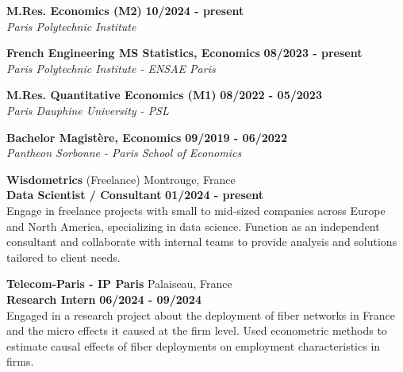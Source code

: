 \begin{flushleft}
\raisebox{-.6ex}{HIGHER EDUCATION} \hrulefill
\end{flushleft}

    \noindent\textbf{M.Res. \textbar\space Economics (M2)}
    \hfill
    \textbf{10/2024 - present} \\
    \emph{Paris Polytechnic Institute} 

    \noindent\textbf{French Engineering MS \textbar\space Statistics,  Economics}
    \hfill
    \textbf{08/2023 - present} \\
    \emph{Paris Polytechnic Institute - ENSAE Paris}

    \noindent\textbf{M.Res. \textbar\space Quantitative Economics (M1)}
    \hfill
    \textbf{08/2022 - 05/2023} \\
    \emph{Paris Dauphine University - PSL}

    \noindent\textbf{Bachelor \textbar\space Magistère, Economics}
    \hfill
    \textbf{09/2019 - 06/2022} \\
    \emph{Pantheon Sorbonne - Paris School of Economics}
	

\begin{flushleft}
\raisebox{-.6ex}{WORK \& RESEARCH EXPERIENCE} \hrulefill
\end{flushleft}
	\noindent\textbf{Wisdometrics} (Freelance) \hfill Montrouge, France\\[0.1cm]
    \textbf{Data Scientist / Consultant} \hfill \textbf{01/2024  - present} \\
	Engage in freelance projects with small to mid-sized companies across Europe and North America, specializing in data science. Function as an independent consultant and collaborate with internal teams to provide analysis and solutions tailored to client needs.
    
    \vspace{0.15cm}
    
    \noindent\textbf{Telecom-Paris - IP Paris} \hfill Palaiseau, France\\[0.1cm]
    \textbf{Research Intern} \hfill \textbf{06/2024  - 09/2024} \\
	Engaged in a research project about the deployment of fiber networks in France and the micro effects it caused at the firm level. Used econometric methods to estimate causal effects of fiber deployments on employment characteristics in firms.

    \vspace{0.15cm}

